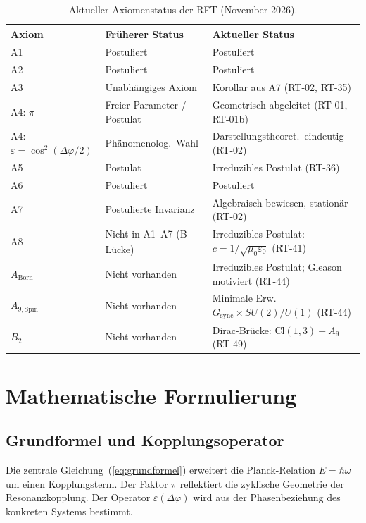 \documentclass[12pt]{iopart}
\begin{document}
	\begin{table}[ht]
		\centering
		\caption{Aktueller Axiomenstatus der RFT (November 2026).}
		\label{tab:axiom_status}
		\begin{tabular}{lll}
			\hline
			\textbf{Axiom} & \textbf{Fr\"uherer Status}
			& \textbf{Aktueller Status} \\
			\hline
			A1 & Postuliert & Postuliert \\
			A2 & Postuliert & Postuliert \\
			A3 & Unabh\"angiges Axiom
			& Korollar aus A7 (RT-02, RT-35) \\
			A4: $\pi$ & Freier Parameter / Postulat
			& Geometrisch abgeleitet (RT-01, RT-01b) \\
			A4: $\varepsilon{=}\cos^2(\Delta\varphi/2)$ & Ph\"anomenolog.\ Wahl
			& Darstellungstheoret.\ eindeutig (RT-02) \\
			A5 & Postulat
			& Irreduzibles Postulat (RT-36) \\
			A6 & Postuliert & Postuliert \\
			A7 & Postulierte Invarianz
			& Algebraisch bewiesen, stationär (RT-02) \\
			A8 & Nicht in A1--A7 (B\textsubscript{1}-Lücke)
			& Irreduzibles Postulat: $c=1/\sqrt{\mu_0\varepsilon_0}$ (RT-41) \\
			$A_{\mathrm{Born}}$ & Nicht vorhanden
			& Irreduzibles Postulat; Gleason motiviert (RT-44) \\
			$A_{\mathrm{9,Spin}}$ & Nicht vorhanden
			& Minimale Erw.\ $G_{\mathrm{sync}}{\times}SU(2)/U(1)$ (RT-44) \\
			$B_2$ & Nicht vorhanden
			& Dirac-Brücke: $\mathrm{Cl}(1,3){+}A_9$ (RT-49) \\
			\hline
		\end{tabular}
	\end{table}
	
	
	\section{Mathematische Formulierung}
	
	\subsection{Grundformel und Kopplungsoperator}
	
	Die zentrale Gleichung~(\ref{eq:grundformel}) erweitert die
	Planck-Relation $E = \hbar\omega$ um einen
	Kopplungsterm. Der Faktor $\pi$ reflektiert die
	zyklische Geometrie der Resonanzkopplung. Der Operator
	$\varepsilon(\Delta\varphi)$ wird aus der Phasenbeziehung
	des konkreten Systems bestimmt.
	
\end{document}
